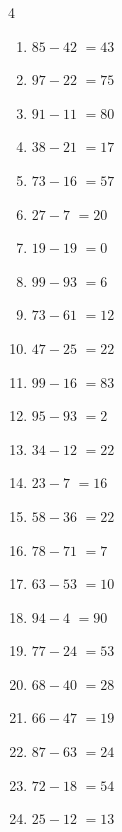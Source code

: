 \begin{multicols}{4}
\begin{enumerate}
  \item $85-42$
        $=43$

  \item $97-22$
        $=75$

  \item $91-11$
        $=80$

  \item $38-21$
        $=17$

  \item $73-16$
        $=57$

  \item $27-7$
        $=20$

  \item $19-19$
        $=0$

  \item $99-93$
        $=6$

  \item $73-61$
        $=12$

  \item $47-25$
        $=22$

  \item $99-16$
        $=83$

  \item $95-93$
        $=2$

  \item $34-12$
        $=22$

  \item $23-7$
        $=16$

  \item $58-36$
        $=22$

  \item $78-71$
        $=7$

  \item $63-53$
        $=10$

  \item $94-4$
        $=90$

  \item $77-24$
        $=53$

  \item $68-40$
        $=28$

  \item $66-47$
        $=19$

  \item $87-63$
        $=24$

  \item $72-18$
        $=54$

  \item $25-12$
        $=13$


\end{enumerate}
\end{multicols}
